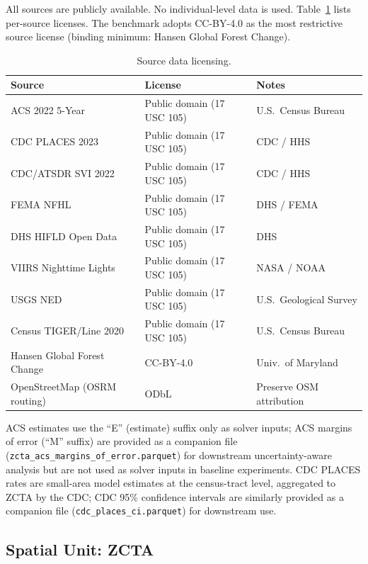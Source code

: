 \documentclass{article}
\begin{document}
All sources are publicly available. No individual-level data is used. Table~\ref{tab:source_licenses} lists per-source licenses. The benchmark adopts CC-BY-4.0 as the most restrictive source license (binding minimum: Hansen Global Forest Change).

\begin{table}[htbp]
\centering
\small
\caption{Source data licensing.}
\label{tab:source_licenses}
\begin{tabular}{lll}
\toprule
\textbf{Source} & \textbf{License} & \textbf{Notes} \\
\midrule
ACS 2022 5-Year & Public domain (17 USC 105) & U.S.\ Census Bureau \\
CDC PLACES 2023 & Public domain (17 USC 105) & CDC / HHS \\
CDC/ATSDR SVI 2022 & Public domain (17 USC 105) & CDC / HHS \\
FEMA NFHL & Public domain (17 USC 105) & DHS / FEMA \\
DHS HIFLD Open Data & Public domain (17 USC 105) & DHS \\
VIIRS Nighttime Lights & Public domain (17 USC 105) & NASA / NOAA \\
USGS NED & Public domain (17 USC 105) & U.S.\ Geological Survey \\
Census TIGER/Line 2020 & Public domain (17 USC 105) & U.S.\ Census Bureau \\
Hansen Global Forest Change & CC-BY-4.0 & Univ.\ of Maryland \\
OpenStreetMap (OSRM routing) & ODbL & Preserve OSM attribution \\
\bottomrule
\end{tabular}
\end{table}

ACS estimates use the ``E'' (estimate) suffix only as solver inputs; ACS margins of error (``M'' suffix) are provided as a companion file (\texttt{zcta\_acs\_margins\_of\_error.parquet}) for downstream uncertainty-aware analysis but are not used as solver inputs in baseline experiments. CDC PLACES rates are small-area model estimates at the census-tract level, aggregated to ZCTA by the CDC; CDC 95\% confidence intervals are similarly provided as a companion file (\texttt{cdc\_places\_ci.parquet}) for downstream use.

\subsection{Spatial Unit: ZCTA}
\end{document}
